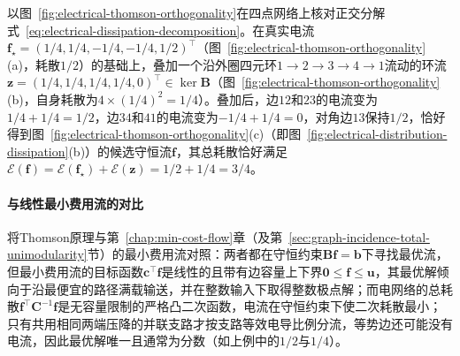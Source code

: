 以图~\ref{fig:electrical-thomson-orthogonality}在四点网络上核对正交分解式~\eqref{eq:electrical-dissipation-decomposition}。在真实电流$\bm f_\star=(1/4,1/4,-1/4,-1/4,1/2)^\top$（图~\ref{fig:electrical-thomson-orthogonality}(a)，耗散$1/2$）的基础上，叠加一个沿外圈四元环$1\to2\to3\to4\to1$流动的环流$\bm z=(1/4,1/4,1/4,1/4,0)^\top\in\ker\bm B$（图~\ref{fig:electrical-thomson-orthogonality}(b)，自身耗散为$4\times(1/4)^2=1/4$）。叠加后，边$12$和$23$的电流变为$1/4+1/4=1/2$，边$34$和$41$的电流变为$-1/4+1/4=0$，对角边$13$保持$1/2$，恰好得到图~\ref{fig:electrical-thomson-orthogonality}(c)（即图~\ref{fig:electrical-distribution-dissipation}(b)）的候选守恒流$\bm f$，其总耗散恰好满足$\mathcal E(\bm f)=\mathcal E(\bm f_\star)+\mathcal E(\bm z)=1/2+1/4=3/4$。

\paragraph{与线性最小费用流的对比}

将Thomson原理与第~\ref{chap:min-cost-flow}章（及第~\ref{sec:graph-incidence-total-unimodularity}节）的最小费用流对照：两者都在守恒约束$\bm B\bm f=\bm b$下寻找最优流，但最小费用流的目标函数$\bm c^\top\bm f$是线性的且带有边容量上下界$\bm 0\leq\bm f\leq\bm u$，其最优解倾向于沿最便宜的路径满载输送，并在整数输入下取得整数极点解；而电网络的总耗散$\bm f^\top\bm C^{-1}\bm f$是无容量限制的严格凸二次函数，电流在守恒约束下使二次耗散最小；只有共用相同两端压降的并联支路才按支路等效电导比例分流，等势边还可能没有电流，因此最优解唯一且通常为分数（如上例中的$1/2$与$1/4$）。
